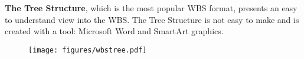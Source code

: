 

\textbf{The Tree Structure}, which is the most popular WBS format, presents an easy to understand view into the WBS. The Tree Structure is not easy to make and is created with a tool: Microsoft Word and SmartArt graphics.\\
\begin{figure}[H]
\texttt{[image: figures/wbstree.pdf]}
\end{figure}